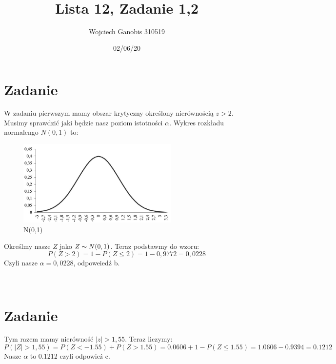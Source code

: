\documentclass{article}
\title{Lista 12, Zadanie 1,2}
\author{Wojciech Ganobis 310519}
\date{02/06/20}
\begin{document}
\maketitle

\section{Zadanie}
W zadaniu pierwszym mamy obszar krytyczny określony nierównością $z > 2$. Musimy sprawdzić jaki będzie nasz poziom istotności $\alpha$. Wykres rozkładu normalengo $N(0,1)$ to:
\begin{figure}[h]
	\centering
   
		\includegraphics[width=8cm]{plot1}
		\caption{N(0,1)}
\end{figure}
Określmy nasze $Z$ jako $Z \thicksim N(0,1)$.
Teraz podstawmy do wzoru:\\
$$P(Z > 2) = 1 - P(Z \leq 2) = 1 - 0,9772 = 0,0228$$
Czyli nasze $\alpha =  0,0228$, odpoweiedź b.\\\\\\
\section{Zadanie}
Tym razem mamy nierówność $|z| > 1,55$.
Teraz liczymy:
$$P(|Z| > 1,55) = P(Z < -1.55) + P(Z > 1.55) = 0.0606 + 1 - P(Z \leq 1.55) = 1.0606 - 0.9394 = 0.1212$$
Nasze $\alpha$ to 0.1212 czyli odpowieź c.
\end{document}
